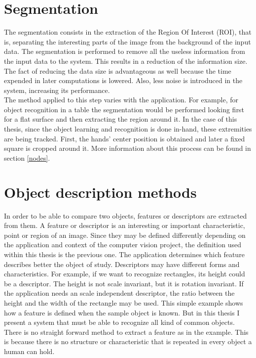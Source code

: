 \section{Segmentation}
\label{segmentation}
The segmentation consists in the extraction of the Region Of Interest (ROI), that is, separating the interesting parts of the image from the background of the input data. 
The segmentation is performed to remove all the useless information from the input data to the system. 
This results in a reduction of the information size. 
The fact of reducing the data size is advantageous as well because the time expended in later computations is lowered. 
Also, less noise is introduced in the system, increasing its performance. 
\\

The method applied to this step varies with the application. 
For example, for object recognition in a table the segmentation would be performed looking first for a flat surface and then extracting the region around it. 
In the case of this thesis, since the object learning and recognition is done in-hand, these extremities are being tracked. 
First, the hands' center position is obtained and later a fixed square is cropped around it. 
More information about this process can be found in section \ref{nodes}.



\section{Object description methods}
\label{descriptors}
In order to be able to compare two objects, features or descriptors are extracted from them. 
A feature or descriptor is an interesting or important characteristic, point or region of an image. 
Since they may be defined differently depending on the application and context of the computer vision project, the definition used within this thesis is the previous one. 
The application determines which feature describes better the object of study. 
Descriptors may have different forms and characteristics. 
For example, if we want to recognize rectangles, its height could be a descriptor.
The height is not scale invariant, but it is rotation invariant. 
If the application needs an scale independent descriptor, the ratio between the height and the width of the rectangle may be used. 
This simple example shows how a feature is defined when the sample object is known. 
But in this thesis I present a system that must be able to recognize all kind of common objects. 
There is no straight forward method to extract a feature as in the example. 
This is because there is no structure or characteristic that is repeated in every object a human can hold. 
\\

